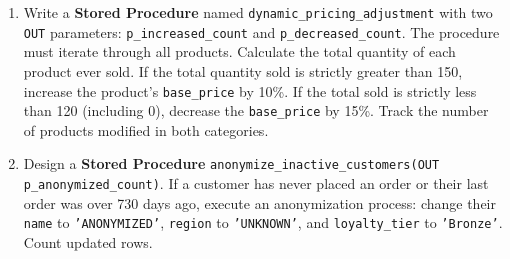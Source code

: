\documentclass[12pt,a4paper]{article}
\newif\ifshowsolutions
\begin{document}
\begin{enumerate}
    \item Write a \textbf{Stored Procedure} named \texttt{dynamic\_pricing\_adjustment} with two \texttt{OUT} parameters: \texttt{p\_increased\_count} and \texttt{p\_decreased\_count}. The procedure must iterate through all products. Calculate the total quantity of each product ever sold. If the total quantity sold is strictly greater than 150, increase the product's \texttt{base\_price} by 10\%. If the total sold is strictly less than 120 (including 0), decrease the \texttt{base\_price} by 15\%. Track the number of products modified in both categories.
    
    \ifshowsolutions
    \textbf{Solution:}
    \begin{lstlisting}[language=SQL]
CREATE OR REPLACE PROCEDURE dynamic_pricing_adjustment(OUT p_increased_count INT, OUT p_decreased_count INT) 
LANGUAGE plpgsql AS $$
DECLARE 
    v_prod RECORD;
BEGIN
    p_increased_count := 0; 
    p_decreased_count := 0;

    -- Optimized: Filter products before the loop to those that meet either threshold
    FOR v_prod IN 
        SELECT p.product_id, COALESCE(SUM(oi.quantity), 0) AS qty 
        FROM products p LEFT JOIN order_items oi USING (product_id) 
        GROUP BY p.product_id 
        HAVING COALESCE(SUM(oi.quantity), 0) > 150 OR COALESCE(SUM(oi.quantity), 0) < 120 
    LOOP
        IF v_prod.qty > 150 THEN
            UPDATE products SET base_price = base_price * 1.10 WHERE product_id = v_prod.product_id;
            p_increased_count := p_increased_count + 1;
        ELSE 
            UPDATE products SET base_price = base_price * 0.85 WHERE product_id = v_prod.product_id;
            p_decreased_count := p_decreased_count + 1;
        END IF;
    END LOOP;
    COMMIT;
END; 
$$;

-- Syntax to execute from an anonymous block
DO $$
DECLARE 
    v_inc INT; 
    v_dec INT;
BEGIN
    CALL dynamic_pricing_adjustment(v_inc, v_dec);
    RAISE NOTICE 'Products Increased: %, Products Decreased: %', v_inc, v_dec;
END;
$$;
    \end{lstlisting}
    \fi

    \item Design a \textbf{Stored Procedure} \texttt{anonymize\_inactive\_customers(OUT p\_anonymized\_count)}. If a customer has never placed an order or their last order was over 730 days ago, execute an anonymization process: change their \texttt{name} to \texttt{'ANONYMIZED'}, \texttt{region} to \texttt{'UNKNOWN'}, and \texttt{loyalty\_tier} to \texttt{'Bronze'}. Count updated rows.


\end{enumerate}
\end{document}
